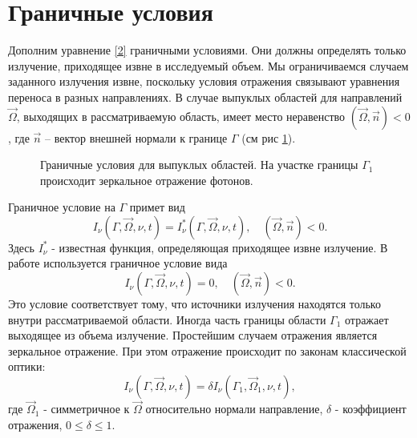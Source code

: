 \section {Граничные условия}
Дополним уравнение \eqref{2} граничными условиями. Они должны определять только излучение, приходящее извне в исследуемый объем. Мы ограничиваемся случаем заданного излучения извне, поскольку условия отражения связывают уравнения переноса в разных направлениях. В случае выпуклых областей для направлений $\vec\Omega$, выходящих в рассматриваемую область, имеет место неравенство $(\vec\Omega, \vec n) < 0$, где $\vec n$ -- вектор внешней нормали к границе $\Gamma$ (см рис \ref{fig:6}).
\begin{figure}[ht!]
	\caption{Граничные условия для выпуклых областей. На участке границы $\Gamma_1$ происходит зеркальное отражение фотонов.}
	\label{fig:6}
\end{figure}

Граничное условие на $\Gamma$ примет вид
\begin {equation}
I_\nu (\Gamma, \vec\Omega, \nu, t) = I_\nu^*(\Gamma, \vec\Omega, \nu, t), \quad (\vec\Omega, \vec n) < 0.
\end {equation}
Здесь $I_\nu^*$ - известная функция, определяющая приходящее извне излучение. В работе используется граничное условие вида
\begin {equation}
I_\nu (\Gamma, \vec\Omega, \nu, t) = 0, \quad (\vec\Omega, \vec n) < 0.
\end {equation}
Это условие соответствует тому, что источники излучения находятся только внутри рассматриваемой области.
Иногда часть границы области $\Gamma_1$ отражает выходящее из объема излучение. Простейшим случаем отражения является зеркальное отражение. При этом отражение происходит по законам классической оптики:
\begin {equation}
I_\nu (\Gamma, \vec\Omega, \nu, t) = \delta I_\nu(\Gamma_1, \vec\Omega_1, \nu, t), 
\end {equation}
где $\vec\Omega_1$ - симметричное к $\vec\Omega$ относительно нормали направление, $\delta$ - коэффициент отражения, $0 \leqslant \delta \leqslant 1$.
